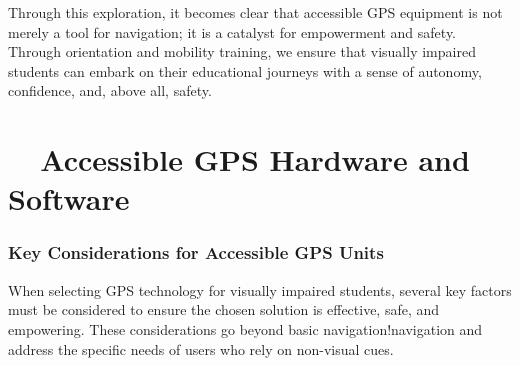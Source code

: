 Through this exploration, it becomes clear that accessible GPS equipment is not merely a tool for \gls{navigation}; it is a catalyst for empowerment and safety. Through \gls{orientation} and \gls{mobility} training, we ensure that visually impaired students can embark on their educational journeys with a sense of autonomy, confidence, and, above all, safety.

\section{~~Accessible GPS Hardware and Software}\label{ch8:sec:accessible-gps-hardware}

\subsubsection{Key Considerations for Accessible GPS Units}
When selecting GPS \gls{technology} for visually impaired students, several key factors must be considered to ensure the chosen solution is effective, safe, and empowering. These considerations go beyond basic navigation!navigation and address the specific needs of users who rely on non-visual cues.

